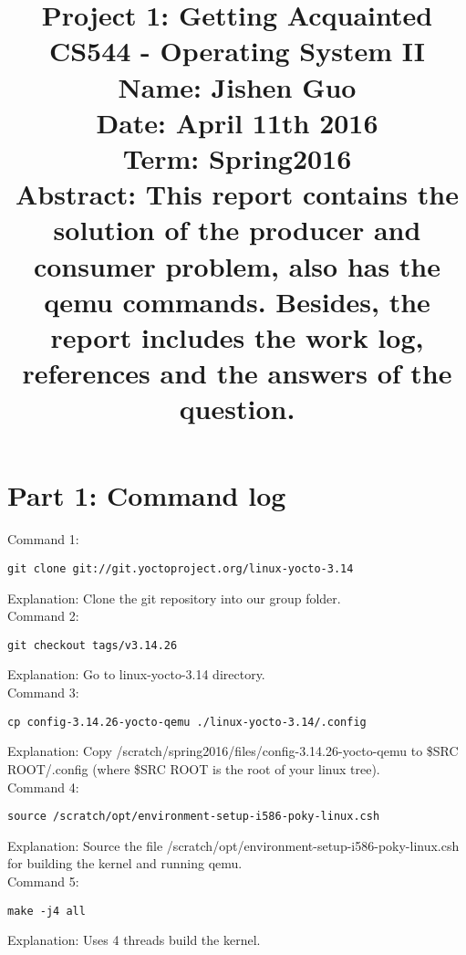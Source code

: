 \documentclass[10pt,draftclsnofoot,peerreview,letterpaper,onecolumn,]{IEEEtran}
\begin{document}
\break
\break
\break
\break
\break
\title{
\textbf{Project 1: Getting Acquainted}\\
\hfill \break
\hfill \break
\hfill \break
\hfill \break
\hfill \break
\large{CS544 - Operating System II\\
\hfill \break
Name: Jishen Guo\\
\hfill \break
Date: April 11th 2016\\
\hfill \break
Term: Spring2016\\
\hfill \break
}
\hfill \break
\hfill \break
\hfill \break
\hfill \break
\hfill \break
\large{Abstract:
This report contains the solution of the producer and consumer problem, also has the qemu commands. Besides, the report includes the work log, references and the answers of the question.
}
}
 
\IEEEpeerreviewmaketitle{ }

\newpage

\section{Part 1: Command log}
Command 1:
\begin{verbatim}
git clone git://git.yoctoproject.org/linux-yocto-3.14
\end{verbatim}
Explanation: Clone the git repository into our group folder.\\

Command 2:
\begin{verbatim}
git checkout tags/v3.14.26
\end{verbatim}
Explanation: Go to linux-yocto-3.14 directory.\\

Command 3:
\begin{verbatim}
cp config-3.14.26-yocto-qemu ./linux-yocto-3.14/.config
\end{verbatim}
Explanation: Copy /scratch/spring2016/files/config-3.14.26-yocto-qemu to \$SRC ROOT/.config (where \$SRC ROOT is the root of your linux tree).\\

Command 4:
\begin{verbatim}
source /scratch/opt/environment-setup-i586-poky-linux.csh
\end{verbatim}
Explanation: Source the file /scratch/opt/environment-setup-i586-poky-linux.csh for building the kernel and running qemu.\\

Command 5:
\begin{verbatim}
make -j4 all
\end{verbatim}
Explanation: Uses 4 threads build the kernel.\\
\end{document}

